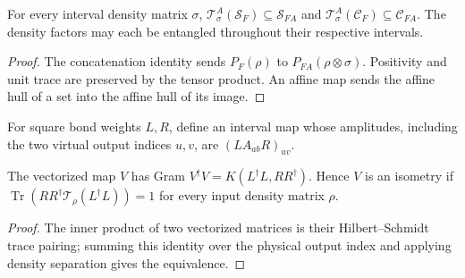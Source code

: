 \begin{lemma}
    \label{thm:mpu_prefix_affine_hull_transfer}
    \leanok
    For every interval density matrix $\sigma$,
    $\mathcal T^A_\sigma(\mathcal S_F)\subseteq\mathcal S_{FA}$ and
    $\mathcal T^A_\sigma(\mathcal C_F)\subseteq\mathcal C_{FA}$.
    The density factors may each be entangled throughout their
    respective intervals.
\end{lemma}
\begin{proof}\leanok
    The concatenation identity sends $P_F(\rho)$ to
    $P_{FA}(\rho\otimes\sigma)$. Positivity and unit trace are
    preserved by the tensor product. An affine map sends the affine
    hull of a set into the affine hull of its image.
\end{proof}

\begin{definition}
    \label{def:mpu_vectorized_weighted_interval}
    \leanok
    For square bond weights $L,R$, define an interval map whose
    amplitudes, including the two virtual output indices $u,v$, are
    $(LA_{ab}R)_{uv}$.
\end{definition}

\begin{lemma}
    \label{thm:mpu_vectorized_density_isometry}
    \leanok
    The vectorized map $V$ has Gram $V^\dagger V=K(L^\dagger L,RR^\dagger)$.
    Hence $V$ is an isometry if
    $\operatorname{Tr}(RR^\dagger\mathcal T_\rho(L^\dagger L))=1$
    for every input density matrix $\rho$.
\end{lemma}
\begin{proof}\leanok
    The inner product of two vectorized matrices is their
    Hilbert--Schmidt trace pairing; summing this identity over the
    physical output index and applying density separation gives the equivalence.
\end{proof}

